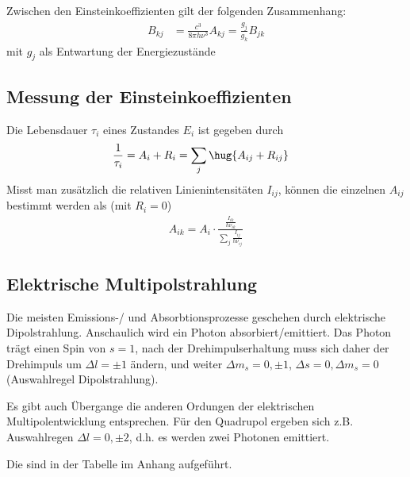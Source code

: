 \documentclass[twocolumn]{summery_4.1}
\begin{document}
Zwischen den Einsteinkoeffizienten gilt der folgenden Zusammenhang:
\begin{align*}
    B_{kj} &= \frac{c^3} {8\pi h \nu^3}A_{kj} =\frac{g_j}{g_k} B_{jk}
\end{align*}
mit \(g_j\) als Entwartung der Energiezustände

\subsection{Messung der Einsteinkoeffizienten}
Die Lebensdauer \(\tau_i\) eines Zustandes \(E_i\) ist gegeben durch
\begin{align*}
    \frac{1}{\tau_i} &= A_i + R_i= \sum_j \hug{A_{ij} + R_{ij}}
\end{align*}
Misst man zusätzlich die relativen Linienintensitäten \(I_{ij}\), können die einzelnen \(A_{ij}\) bestimmt werden als (mit \(R_i = 0\))
\begin{align*}
    A_{ik} = A_i \cdot \frac{\frac{I_{ik}}{h\nu_{ik}}}{\sum_j \frac{I_{ij}}{h\nu_{ij}}}
\end{align*}

\subsection{Elektrische Multipolstrahlung}
Die meisten Emissions-/ und Absorbtionsprozesse geschehen durch elektrische Dipolstrahlung. Anschaulich wird ein Photon absorbiert/emittiert. Das Photon trägt einen Spin von \(s=1\), nach der Drehimpulserhaltung muss sich daher der Drehimpuls um \(\Delta l = \pm 1\) ändern, und weiter \(\Delta m_s=0,\pm 1\), \(\Delta s = 0, \Delta m_s =0\) (Auswahlregel Dipolstrahlung).

Es gibt auch Übergange die anderen Ordungen der elektrischen Multipolentwicklung entsprechen.
Für den Quadrupol ergeben sich z.B. Auswahlregen \(\Delta l=0,\pm2\), d.h. es werden zwei Photonen emittiert.

Die  sind in der Tabelle im Anhang aufgeführt.
\end{document}
